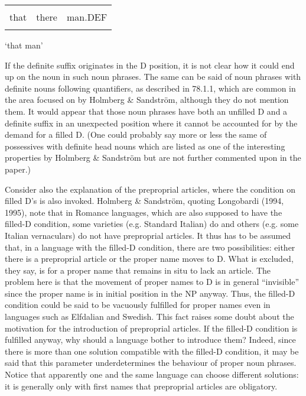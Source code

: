 \begin{tabular}{lll}
\lsptoprule
\multicolumn{3}{l}{an

}\\
that & there & man.DEF\\
\lspbottomrule
\end{tabular}

\begin{styleTranslation}
‘that man’

\end{styleTranslation}

\begin{styleBodyTextFirst}
If the definite suffix originates in the D position, it is not clear how it could end up on the noun in such noun phrases. The same can be said of noun phrases with definite nouns following quantifiers, as described in 78.1.1, which are common in the area focused on by Holmberg \& Sandström, although they do not mention them. It would appear that those noun phrases have both an unfilled D and a definite suffix in an unexpected position where it cannot be accounted for by the demand for a filled D. (One could probably say more or less the same of possessives with definite head nouns which are listed as one of the interesting properties by Holmberg \& Sandström but are not further commented upon in the paper.)

\end{styleBodyTextFirst}

\begin{styleBodytextC}
Consider also the explanation of the preproprial articles, where the condition on filled D’s is also invoked. Holmberg \& Sandström, quoting Longobardi (1994, 1995), note that in Romance languages, which are also supposed to have the filled-D condition, some varieties (e.g. Standard Italian) do and others (e.g. some Italian vernaculars) do not have preproprial articles. It thus has to be assumed that, in a language with the filled-D condition, there are two possibilities: either there is a preproprial article or the proper name moves to D. What is excluded, they say, is for a proper name that remains in situ to lack an article. The problem here is that the movement of proper names to D is in general “invisible” since the proper name is in initial position in the NP anyway. Thus, the filled-D condition could be said to be vacuously fulfilled for proper names even in languages such as Elfdalian and Swedish. This fact raises some doubt about the motivation for the introduction of preproprial articles. If the filled-D condition is fulfilled anyway, why should a language bother to introduce them? Indeed, since there is more than one solution compatible with the filled-D condition, it may be said that this parameter underdetermines the behaviour of proper noun phrases. Notice that apparently one and the same language can choose different solutions: it is generally only with first names that preproprial articles are obligatory. 

\end{styleBodytextC}

